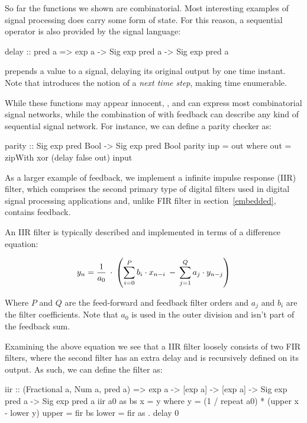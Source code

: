 \documentclass[../paper.tex]{subfiles}
\begin{document}
So far the functions we shown are combinatorial. Most interesting examples of signal processing does carry some form of state. For this reason, a sequential operator is also provided by the signal language:

\begin{code}
delay :: pred a => exp a -> Sig exp pred a -> Sig exp pred a
\end{code}

\noindent {} prepends a value to a signal, delaying its original output by one time instant. Note that  introduces the notion of a \emph{next time step}, making time enumerable.

While these functions may appear innocent, ,  and  can express most combinatorial signal networks, while the combination of  with feedback can describe any kind of sequential signal network. For instance, we can define a parity checker as:

\begin{code}
parity :: Sig exp pred Bool -> Sig exp pred Bool
parity inp = out where
  out = zipWith xor (delay false out) input
\end{code}

As a larger example of feedback, we implement a infinite impulse response (IIR) filter, which comprises the second primary type of digital filters used in digital signal processing applications and, unlike FIR filter in section~\ref{embedded}, contains feedback.

An IIR filter is typically described and implemented in terms of a difference equation:

\begin{equation}
y_{n} = {1 \over a_{0}} \: \cdot \: \left( \sum_{i=0}^{P} b_{i} \cdot x_{n-i} \: - \: \sum_{j=1}^{Q} a_{j} \cdot y_{n-j} \right)
\end{equation}
\vspace{1mm}

\noindent Where $P$ and $Q$ are the feed-forward and feedback filter orders and $a_{j}$ and $b_{i}$ are the filter coefficients. Note that $a_{0}$ is used in the outer division and isn't part of the feedback sum.

Examining the above equation we see that a IIR filter loosely consists of two FIR filters, where the second filter has an extra delay and is recursively defined on its output. As such, we can define the filter as:

\begin{code}
iir :: (Fractional a, Num a, pred a) => exp a -> [exp a] -> [exp a]
  -> Sig exp pred a -> Sig exp pred a
iir a0 as bs x = y
  where
    y = (1 / repeat a0) * (upper x - lower y)
    upper = fir bs
    lower = fir as . delay 0
\end{code}
\end{document}
